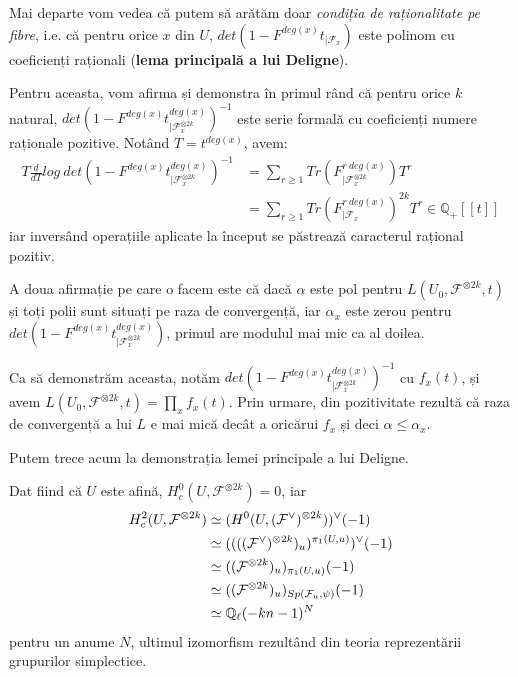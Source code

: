 \documentclass[13pt,openany,oneside]{book}
\begin{document}
Mai departe vom vedea că putem să arătăm doar {\it condiția de raționalitate pe fibre}, i.e. că pentru orice $x$ din $U$, $det(1-F^{deg(x)}t_{\mid\mathcal{F}_x})$ este polinom cu coeficienți raționali ({\bf lema principală a lui Deligne}).

Pentru aceasta, vom afirma și demonstra în primul rând că pentru orice $k$ natural, $det(1-F^{deg(x)}t^{deg(x)}_{\mid\mathcal{F}^{\otimes 2k}_x})^{-1}$ este serie formală cu coeficienți numere raționale pozitive. Notând $T=t^{deg(x)}$, avem:
\begin{align*}
T\frac{d}{dT}log\ det(1-F^{deg(x)}t^{deg(x)}_{\mid\mathcal{F}^{\otimes 2k}_x})^{-1}&=\sum\limits_{r\geq 1} Tr(F^{r\ deg(x)}_{\mid\mathcal{F}^{\otimes 2k}_x})T^r\\
&= \sum\limits_{r\geq 1} Tr(F^{r\ deg(x)}_{\mid\mathcal{F}_x})^{2k} T^r \in \mathbb{Q}_+[[t]]
\end{align*}
iar inversând operațiile aplicate la început se păstrează caracterul rațional pozitiv.

A doua afirmație pe care o facem este că dacă $\alpha$ este pol pentru $L(U_0,\mathcal{F}^{\otimes 2k},t)$ și toți polii sunt situați pe raza de convergență, iar $\alpha_x$ este zerou pentru $det(1-F^{deg(x)}t^{deg(x)}_{\mid\mathcal{F}^{\otimes 2k}_x})$, primul are modulul mai mic ca al doilea.

Ca să demonstrăm aceasta, notăm $det(1-F^{deg(x)}t^{deg(x)}_{\mid\mathcal{F}^{\otimes 2k}_x})^{-1}$ cu $f_x(t)$, și avem $L(U_0,\mathcal{F}^{\otimes 2k},t)=\prod_x f_x(t)$. Prin urmare, din pozitivitate rezultă că raza de convergență a lui $L$ e mai mică decât a oricărui $f_x$ și deci $\alpha\leq\alpha_x$.

Putem trece acum la demonstrația lemei principale a lui Deligne.

Dat fiind că $U$ este afină, $H^0_c(U,\mathcal{F}^{\otimes 2k})=0$, iar
\begin{align*}
H^2_c(U,\mathcal{F}^{\otimes 2k}) &\simeq (H^0(U,(\mathcal{F}^{\vee})^{\otimes 2k}))^{\vee}(-1)\\
&\simeq ((((\mathcal{F}^\vee)^{\otimes 2k})_u)^{\pi_1(U,u)})^{\vee}(-1)\\
&\simeq ((\mathcal{F}^{\otimes 2k})_u)_{\pi_1(U,u)}(-1)\\
&\simeq ((\mathcal{F}^{\otimes 2k})_u)_{Sp(\mathcal{F}_u,\psi)}(-1)\\
&\simeq \mathbb{Q}_\ell(-kn-1)^N
\end{align*}
pentru un anume $N$, ultimul izomorfism rezultând din teoria reprezentării grupurilor simplectice.
\end{document}
